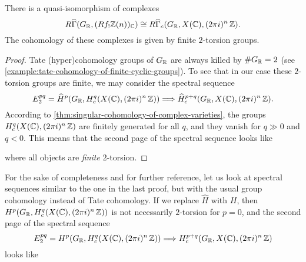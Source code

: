 \begin{theorem}
  \label{thm:RGammahat-GR-Rf!ZnC}
  There is a quasi-isomorphism of complexes
  \[ R\widehat{\Gamma} (G_{\mathbb{R}}, (R f_! \mathbb{Z} (n))_{\mathbb{C}}) \cong
    R\widehat{\Gamma}_c (G_{\mathbb{R}}, X (\mathbb{C}), (2\pi i)^n\,\mathbb{Z}). \]
  The cohomology of these complexes is given by finite $2$-torsion groups.

\begin{proof}
  Tate (hyper)cohomology groups of $G_{\mathbb{R}}$ are always killed by $\# G_{\mathbb{R}} = 2$
  (see \ref{example:tate-cohomology-of-finite-cyclic-groups}). To see that in
  our case these $2$-torsion groups are finite, we may consider the spectral
  sequence
  \[ E_2^{pq} = \widehat{H}^p (G_{\mathbb{R}}, H^q_c (X (\mathbb{C}), (2\pi i)^n \, \mathbb{Z})) \Longrightarrow
    \widehat{H}^{p+q}_c (G_{\mathbb{R}}, X (\mathbb{C}), (2\pi i)^n \, \mathbb{Z}). \]
    According to \ref{thm:singular-cohomology-of-complex-varieties}, the groups
    $H^q_c (X (\mathbb{C}), (2\pi i)^n \, \mathbb{Z})$ are finitely generated for all
    $q$, and they vanish for $q \gg 0$ and $q < 0$. This means that the second
    page of the spectral sequence looks like

    \begin{center}
    \end{center}

    \noindent where all objects are \emph{finite} $2$-torsion.
  \end{proof}
\end{theorem}

For the sake of completeness and for further reference, let us look at spectral
sequences similar to the one in the last proof, but with the usual group
cohomology instead of Tate cohomology. If we replace $\widehat{H}$ with $H$,
then $H^p (G_{\mathbb{R}}, H^q_c (X (\mathbb{C}), (2\pi i)^n \, \mathbb{Z}))$ is not necessarily
$2$-torsion for $p = 0$, and the second page of the spectral sequence
\[ E_2^{pq} = H^p (G_{\mathbb{R}}, H^q_c (X (\mathbb{C}), (2\pi i)^n \, \mathbb{Z})) \Longrightarrow
  H^{p+q}_c (G_{\mathbb{R}}, X (\mathbb{C}), (2\pi i)^n \, \mathbb{Z}) \]
looks like

